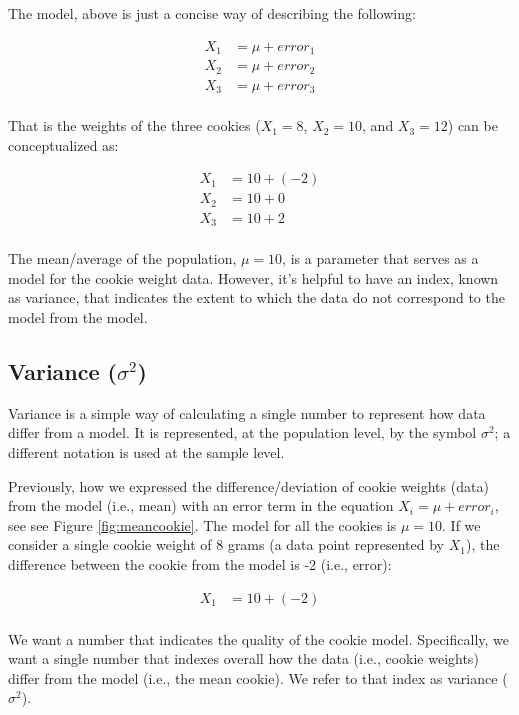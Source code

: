 \documentclass[
]{krantz}
\begin{document}
The model, above is just a concise way of describing the following:

\[
\begin{aligned} 
X_1 &= \mu + error_1 \\
X_2 &= \mu + error_2 \\
X_3 &= \mu + error_3 \\
\end{aligned} 
\]

That is the weights of the three cookies (\(X_1 = 8\), \(X_2 = 10\), and \(X_3 = 12\)) can be conceptualized as:

\[
\begin{aligned} 
X_1 &= 10 + (-2) \\
X_2 &= 10 + 0 \\
X_3 &= 10 + 2 \\
\end{aligned} 
\]

The mean/average of the population, \(\mu = 10\), is a parameter that serves as a model for the cookie weight data. However, it's helpful to have an index, known as variance, that indicates the extent to which the data do not correspond to the model from the model.

\hypertarget{variance-sigma2}{%
\subsection{\texorpdfstring{Variance (\(\sigma^2\))}{Variance (\textbackslash sigma\^{}2)}}\label{variance-sigma2}}

Variance is a simple way of calculating a single number to represent how data differ from a model. It is represented, at the population level, by the symbol \(\sigma^2\); a different notation is used at the sample level.

Previously, how we expressed the difference/deviation of cookie weights (data) from the model (i.e., mean) with an error term in the equation \(X_i = \mu +error_i\), see see Figure \ref{fig:meancookie}. The model for all the cookies is \(\mu = 10\). If we consider a single cookie weight of 8 grams (a data point represented by \(X_1\)), the difference between the cookie from the model is -2 (i.e., error):

\[
\begin{aligned} 
X_1 &= 10 + (-2) \\
\end{aligned} 
\]

We want a number that indicates the quality of the cookie model. Specifically, we want a single number that indexes overall how the data (i.e., cookie weights) differ from the model (i.e., the mean cookie). We refer to that index as variance (\(\sigma^2\)).
\end{document}
